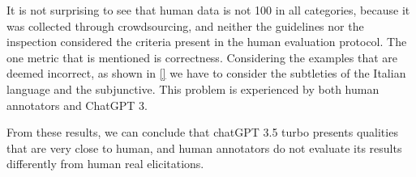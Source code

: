 It is not surprising to see that human data is not 100 in all categories, because it was collected through crowdsourcing, and neither the guidelines nor the inspection considered the criteria present in the human evaluation protocol. The one metric that is mentioned is correctness. Considering the examples that are deemed incorrect, as shown in \ref{} we have to consider the subtleties of the Italian language and the subjunctive. This problem is experienced by both human annotators and ChatGPT 3.

From these results, we can conclude that chatGPT 3.5 turbo presents qualities that are very close to human, and human annotators do not evaluate its results differently from human real elicitations. 

